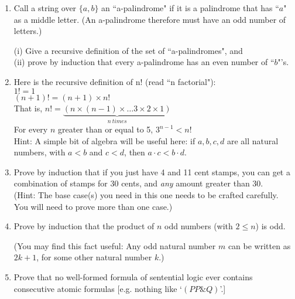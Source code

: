\documentclass[12pt]{article}
\begin{document}
\begin{enumerate}

\item	
 Call a string over $\{a, b\}$
an ``a-palindrome" if it is a palindrome that has ``$a$" as a middle letter. (An a-palindrome therefore must have an odd number of letters.) 

(i) Give a recursive definition of the set of ``a-palindromes", and \\
(ii) prove by induction that every a-palindrome has an even number of ``$b$"'s. \\

\item Here is the recursive definition of n! (read ``n factorial"):\\
\noindent $1! = 1$\\
\noindent $(n+1)! = (n + 1) \times n!$\\

\noindent That is, $n! = \underbrace{(n \times (n-1) \times \ldots 3 \times 2 \times 1)}_{n \ times}$\\

 For every $n$ greater than or equal to 5, $3^{n-1} < n!$ \\%

Hint: A simple bit of algebra will be useful here: if $a, b, c, d$ are all natural numbers, with $a < b$ and $c < d$,
then $a\cdot c < b\cdot d$.
  
  
   
\item Prove by induction that if you just have 4 and 11 cent stamps, you can get a combination of stamps for 30 cents, and {\it{any}} amount greater than 30. \\ (Hint: The base case(s) you need in this one needs to be crafted carefully. You will need to prove more than one case.)

\item Prove by induction that the product of $n$ odd numbers (with $2 \leq n$) is odd.

(You may find this fact useful: Any odd natural number $m$ can be written as $2k+1$, for some other natural number $k$.)\\

\item Prove that no well-formed formula of sentential logic ever contains consecutive atomic formulas [e.g. nothing like `$(PP\&Q)$'.] 

\end{enumerate}
\end{document}
